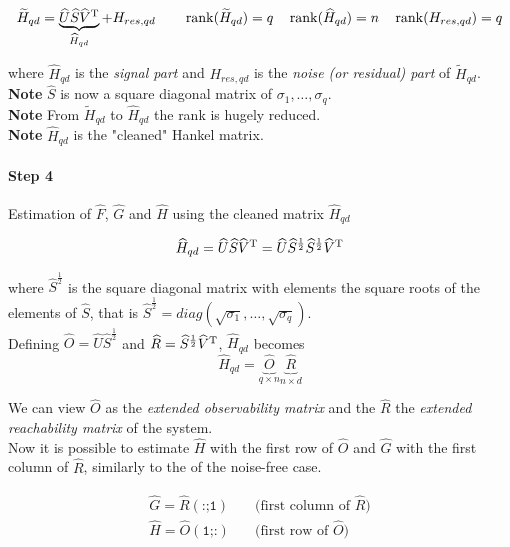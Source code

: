 \[
    \widetilde{H}_{qd} = \underbrace{\widehat{U} \widehat{S} \widehat{V}^{\mathrm{T}}}_{\widehat{H}_{qd}} + H_{res,qd} \qquad \operatorname*{rank} (\widetilde{H}_{qd}) = q \quad \operatorname*{rank} (\widehat{H}_{qd}) = n \quad \operatorname*{rank} (H_{res,qd}) = q
\]

where $\hat{H}_{qd}$ is the \emph{signal part} and $H_{res,qd}$ is the \emph{noise (or residual) part} of $\tilde{H}_{qd}$.\\

\textbf{Note} $\hat{S}$ is now a square diagonal matrix of $\sigma_1, \dots, \sigma_q$.\\
\textbf{Note} From $\tilde{H}_{qd}$ to $\hat{H}_{qd}$ the rank is hugely reduced.\\
\textbf{Note} $\hat{H}_{qd}$ is the "cleaned" Hankel matrix.

\paragraph{Step 4} Estimation of $\hat{F}$, $\hat{G}$ and $\hat{H}$ using the cleaned matrix $\hat{H}_{qd}$

\[
    \widehat{H}_{qd} = \widehat{U} \widehat{S} \widehat{V}^{\mathrm{T}} = \widehat{U} \widehat{S}^{\frac{1}{2}} \widehat{S}^{\frac{1}{2}} \widehat{V}^{\mathrm{T}}
\]

where $\hat{S}^{\frac{1}{2}}$ is the square diagonal matrix with elements the square roots of the elements of $\hat{S}$, that is $\hat{S}^{\frac{1}{2}}=diag(\sqrt{\sigma_1}, \dots, \sqrt{\sigma_q})$. \\

Defining $\hat{O} = \hat{U}\hat{S}^{\frac{1}{2}}$ and $\widehat{R} = \widehat{S}^{\frac{1}{2}} \widehat{V}^{\mathrm{T}}$, $\hat{H}_{qd}$ becomes 
\[\hat{H}_{qd} = \underbrace{\hat{O}}_{q\times n} \underbrace{\hat{R}}_{n\times d}\]


We can view $\hat{O}$ as the \emph{extended observability matrix} and the $\hat{R}$ the \emph{extended reachability matrix} of the system. \\

Now it is possible to estimate $\hat{H}$ with the first row of $\hat{O}$ and $\hat{G}$ with the first column of $\hat{R}$, similarly to the  of the noise-free case.

\begin{align*}
    \hat{G} = \hat{R}(\texttt{:;1}) & \quad\text{(first column of $\hat{R}$)} \\
    \hat{H} = \hat{O}(\texttt{1;:}) & \quad\text{(first row of $\hat{O}$)} \\
\end{align*}



